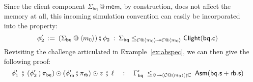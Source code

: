 \documentclass[acmsmall,screen,review,anonymous]{acmart}
\newcommand{\kw}[1]{\ensuremath{ \mathsf{#1} }}
\newcommand{\vcomp}{\fatsemi}
\begin{document}
\begin{example}
Since the client component
$\Sigma_\kw{bq} \mathbin@ \kw{mem}$,
by construction,
does not affect the memory at all,
this incoming simulation convention
can easily be incorporated into the property:
\[
  \phi_2' \: := \:
    (\Sigma_\kw{bq} \mathbin@ \langle m_0 \rangle)
    \vcomp
    \phi_2
  \: : \:
  \Sigma_\kw{bq}
    \le_{\mathcal{C} \mathbin@ \langle m_0 \rangle
         \twoheadrightarrow
         \mathcal{C} \mathbin@ \langle m_0 \rangle}
    \kw{Clight}(\kw{bq.c})
\]
Revisiting the challenge articulated in Example~\ref{ex:abspec},
we can then give the following proof:
\[
  \phi_1'
  \:\vcomp\:
  (\phi_2' \vcomp \pi_\kw{bq}) \odot
  (\phi_\kw{rb}' \vcomp \pi_\kw{rb}) \odot z
  \:\vcomp\:
  \ell
  \quad : \quad
  \Gamma_\kw{bq}'
  \:
  \le_{\varnothing \twoheadrightarrow
       (\mathcal{C} \mathbin@ \langle m_0 \rangle) \vcomp \mathbb{C}}
  \:
  \kw{Asm}(\kw{bq.s} + \kw{rb.s})
\]
\end{example}
\end{document}
